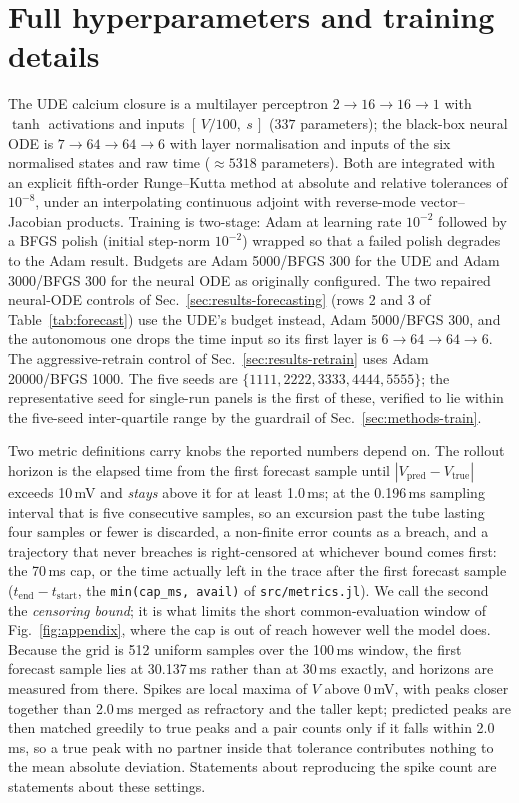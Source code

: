 \documentclass{article}
\newcommand{\Tfull}{100}       %
\newcommand{\Ttrain}{30}       %
\newcommand{\Ndata}{512}       %
\newcommand{\Ttube}{10}        %
\newcommand{\Rcap}{70}         %
\newcommand{\Rsus}{1.0}        %
\newcommand{\Tfcast}{30.137}   %
\newcommand{\Vthresh}{0}       %
\newcommand{\SpikeSep}{2.0}    %
\newcommand{\SpikeTol}{2.0}    %
\newcommand{\AdamUde}{5000}    %
\newcommand{\BfgsUde}{300}     %
\newcommand{\AdamNode}{3000}   %
\newcommand{\BfgsNode}{300}    %
\newcommand{\AdamRe}{20000}    %
\newcommand{\BfgsRe}{1000}     %
\newcommand{\NparamUde}{337}   %
\newcommand{\NparamNode}{5318} %
\newcommand{\NNinputs}{[\,V/100,\ s\,]}              %
\newcommand{\ArchUde}{2\!\to\!16\!\to\!16\!\to\!1}   %
\newcommand{\ArchNode}{7\!\to\!64\!\to\!64\!\to\!6}  %
\newcommand{\ArchNodeAuto}{6\!\to\!64\!\to\!64\!\to\!6} %
\newcommand{\Tol}{10^{-8}}     %
\newcommand{\Lr}{10^{-2}}      %
\newcommand{\dtSample}{0.196}       %
\begin{document}
\section{Full hyperparameters and training details}
\label{app:hyper}

The UDE calcium closure is a multilayer perceptron
$\ArchUde$ with $\tanh$ activations and inputs $\NNinputs$
($\NparamUde$ parameters); the black-box neural ODE is $\ArchNode$ with layer
normalisation and inputs of the six normalised states and raw time
($\approx\NparamNode$ parameters).
Both are integrated with an explicit fifth-order Runge--Kutta method at absolute
and relative tolerances of $\Tol$, under an interpolating continuous adjoint with
reverse-mode vector--Jacobian products. Training is two-stage: Adam at learning
rate $\Lr$ followed by a BFGS polish (initial step-norm $\Lr$) wrapped so that
a failed polish degrades to the Adam result. Budgets are Adam \AdamUde/BFGS
\BfgsUde{} for the UDE and Adam \AdamNode/BFGS \BfgsNode{} for the neural ODE
as originally configured. The two repaired neural-ODE controls of
Sec.~\ref{sec:results-forecasting} (rows 2 and 3 of Table~\ref{tab:forecast}) use
the UDE's budget instead, Adam \AdamUde/BFGS \BfgsUde, and the autonomous one
drops the time input so its first layer is $\ArchNodeAuto$. The
aggressive-retrain control of Sec.~\ref{sec:results-retrain} uses Adam
\AdamRe/BFGS \BfgsRe. The five seeds are $\{1111,2222,3333,4444,5555\}$; %
the representative seed for single-run panels is the first of these, verified
to lie within the five-seed inter-quartile range by the guardrail of
Sec.~\ref{sec:methods-train}.

Two metric definitions carry knobs the reported numbers depend on. The rollout
horizon is the elapsed time from the first forecast sample until
$|V_{\mathrm{pred}}-V_{\mathrm{true}}|$ exceeds \Ttube\,mV and \emph{stays} above
it for at least \Rsus\,ms; at the \dtSample\,ms sampling interval that is five
consecutive samples, so an excursion past the tube lasting four samples or fewer
is discarded, a non-finite error counts as a breach, and a trajectory that never
breaches is right-censored at whichever bound comes first: the \Rcap\,ms cap, or
the time actually left in the trace after the first forecast sample
($t_{\mathrm{end}}-t_{\mathrm{start}}$, the \texttt{min(cap\_ms, avail)} of
\texttt{src/metrics.jl}). We call the second the \emph{censoring bound}; it is
what limits the short common-evaluation window of Fig.~\ref{fig:appendix}, where
the cap is out of reach however well the model does.
Because the grid is \Ndata{} uniform samples
over the \Tfull\,ms window, the first forecast sample lies at \Tfcast\,ms rather
than at \Ttrain\,ms exactly, and horizons are measured from there. Spikes are
local maxima of $V$ above \Vthresh\,mV, with peaks closer together than
\SpikeSep\,ms merged as refractory and the taller kept; predicted peaks are then
matched greedily to true peaks and a pair counts only if it falls within
\SpikeTol\,ms, so a true peak with no partner inside that tolerance contributes
nothing to the mean absolute deviation. Statements about reproducing the spike
count are statements about these settings.
\end{document}
